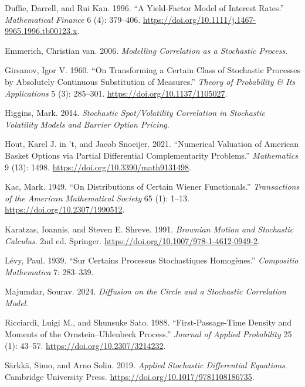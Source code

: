 \documentclass[
  english,
  10pt,
  letterpaper,
  DIV=11,
  numbers=noendperiod]{scrartcl}
\newlength{\cslhangindent}
\newenvironment{CSLReferences}[2] %
 {\begin{list}{}{%
  \setlength{\itemindent}{0pt}
  \setlength{\leftmargin}{0pt}
  \setlength{\parsep}{0pt}
  \ifodd #1
   \setlength{\leftmargin}{\cslhangindent}
   \setlength{\itemindent}{-1\cslhangindent}
  \fi
  \setlength{\itemsep}{#2\baselineskip}}}
 {\end{list}}
\theoremstyle{plain}
\theoremstyle{plain}
\theoremstyle{plain}
\theoremstyle{plain}
\theoremstyle{definition}
\theoremstyle{remark}
\begin{document}
\begin{CSLReferences}{1}{1}
Duffie, Darrell, and Rui Kan. 1996. {``A Yield-Factor Model of Interest
Rates.''} \emph{Mathematical Finance} 6 (4): 379--406.
\url{https://doi.org/10.1111/j.1467-9965.1996.tb00123.x}.

Emmerich, Christian van. 2006. \emph{Modelling Correlation as a
Stochastic Process}.

Girsanov, Igor V. 1960. {``On Transforming a Certain Class of Stochastic
Processes by Absolutely Continuous Substitution of Measures.''}
\emph{Theory of Probability \& Its Applications} 5 (3): 285--301.
\url{https://doi.org/10.1137/1105027}.

Higgins, Mark. 2014. \emph{Stochastic Spot/Volatility Correlation in
Stochastic Volatility Models and Barrier Option Pricing}.

Hout, Karel J. in 't, and Jacob Snoeijer. 2021. {``Numerical Valuation
of {American} Basket Options via Partial Differential Complementarity
Problems.''} \emph{Mathematics} 9 (13): 1498.
\url{https://doi.org/10.3390/math9131498}.

Kac, Mark. 1949. {``On Distributions of Certain {Wiener} Functionals.''}
\emph{Transactions of the American Mathematical Society} 65 (1): 1--13.
\url{https://doi.org/10.2307/1990512}.

Karatzas, Ioannis, and Steven E. Shreve. 1991. \emph{Brownian Motion and
Stochastic Calculus}. 2nd ed. Springer.
\url{https://doi.org/10.1007/978-1-4612-0949-2}.

Lévy, Paul. 1939. {``Sur Certains Processus Stochastiques
Homog{è}nes.''} \emph{Compositio Mathematica} 7: 283--339.

Majumdar, Sourav. 2024. \emph{Diffusion on the Circle and a Stochastic
Correlation Model}.

Ricciardi, Luigi M., and Shunsuke Sato. 1988. {``First-Passage-Time
Density and Moments of the {Ornstein--Uhlenbeck} Process.''}
\emph{Journal of Applied Probability} 25 (1): 43--57.
\url{https://doi.org/10.2307/3214232}.

Särkkä, Simo, and Arno Solin. 2019. \emph{Applied Stochastic
Differential Equations}. Cambridge University Press.
\url{https://doi.org/10.1017/9781108186735}.


\end{CSLReferences}
\end{document}
